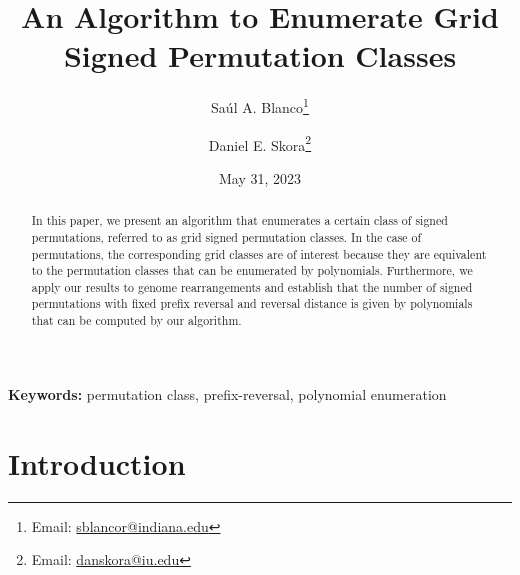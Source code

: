 \documentclass{article}
\title{An Algorithm to Enumerate Grid Signed Permutation Classes}
\author{Sa\'ul A. Blanco\thanks{Email: \href{mailto:sblancor@indiana.edu}{sblancor@indiana.edu}}\;}
\author{Daniel E. Skora\thanks{Email: \href{mailto:danskora@iu.edu}{danskora@iu.edu}}}
\affil{Department of Computer Science\\ Indiana University\\Bloomington, IN 47408}
\date{May 31,  2023}
\numberwithin{equation}{section}
\theoremstyle{definition}
\begin{document}
\maketitle


\begin{abstract}
  In this paper, we present an algorithm that enumerates a certain class of signed permutations, referred to as grid signed permutation classes. In the case of permutations, the corresponding grid classes are of interest because they are equivalent to the permutation classes that can be enumerated by polynomials. Furthermore, we apply our results to genome rearrangements and establish that the number of signed permutations with fixed prefix reversal and reversal distance is given by polynomials that can be computed by our algorithm. 
\end{abstract}


\textbf{Keywords:} permutation class, prefix-reversal, polynomial enumeration

\maketitle


\section{Introduction}
\end{document}
